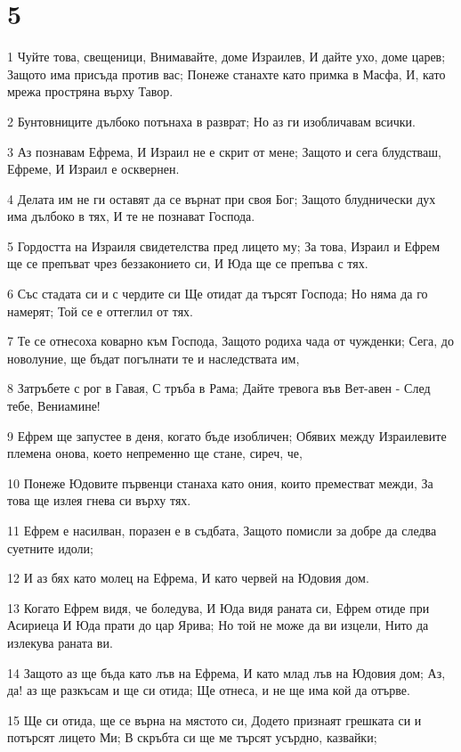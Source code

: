 \chapter{5}

\par 1 Чуйте това, свещеници, Внимавайте, доме Израилев, И дайте ухо, доме царев; Защото има присъда против вас; Понеже станахте като примка в Масфа, И, като мрежа простряна върху Тавор.
\par 2 Бунтовниците дълбоко потънаха в разврат; Но аз ги изобличавам всички.
\par 3 Аз познавам Ефрема, И Израил не е скрит от мене; Защото и сега блудстваш, Ефреме, И Израил е осквернен.
\par 4 Делата им не ги оставят да се върнат при своя Бог; Защото блуднически дух има дълбоко в тях, И те не познават Господа.
\par 5 Гордостта на Израиля свидетелства пред лицето му; За това, Израил и Ефрем ще се препъват чрез беззаконието си, И Юда ще се препъва с тях.
\par 6 Със стадата си и с чердите си Ще отидат да търсят Господа; Но няма да го намерят; Той се е оттеглил от тях.
\par 7 Те се отнесоха коварно към Господа, Защото родиха чада от чужденки; Сега, до новолуние, ще бъдат погълнати те и наследствата им,
\par 8 Затръбете с рог в Гавая, С тръба в Рама; Дайте тревога във Вет-авен - След тебе, Вениамине!
\par 9 Ефрем ще запустее в деня, когато бъде изобличен; Обявих между Израилевите племена онова, което непременно ще стане, сиреч, че,
\par 10 Понеже Юдовите първенци станаха като ония, които преместват межди, За това ще излея гнева си върху тях.
\par 11 Ефрем е насилван, поразен е в съдбата, Защото помисли за добре да следва суетните идоли;
\par 12 И аз бях като молец на Ефрема, И като червей на Юдовия дом.
\par 13 Когато Ефрем видя, че боледува, И Юда видя  раната си, Ефрем отиде при Асириеца И Юда прати до цар Ярива; Но той не може да ви изцели, Нито да излекува раната ви.
\par 14 Защото аз ще бъда като лъв на Ефрема, И като млад лъв на Юдовия дом; Аз, да! аз ще разкъсам и ще си отида; Ще отнеса, и не ще има кой да отърве.
\par 15 Ще си отида, ще се върна на мястото си, Додето признаят грешката си и потърсят лицето Ми; В скръбта си ще ме търсят усърдно, казвайки;

